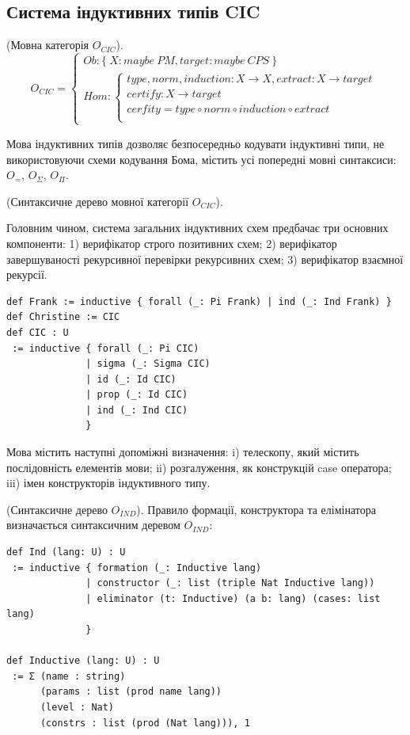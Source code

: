 \newpage
\subsection{Система індуктивних типів CIC}

\begin{definition} (Мовна категорія $O_{CIC}$).
\begin{equation}
O_{CIC} =
\begin{cases}
Ob: \{\ X: maybe\ PM, target: maybe\ CPS\ \} \\
Hom: \begin{cases}
type,norm,induction: X \rightarrow X, extract: X \rightarrow target \\
certify : X \rightarrow target \\
cerfity = type \circ norm \circ induction \circ extract \\
\end{cases}
\end{cases}
\end{equation}
\end{definition}

Мова індуктивних типів дозволяє безпосередньо кодувати індуктивні типи,
не використовуючи схеми кодування Бома, містить усі попередні мовні синтаксиси:
$O_=$, $O_\Sigma$, $O_\Pi$.

\begin{definition} (Синтаксичне дерево мовної категорії $O_{CIC}$).

Головним чином, система загальних індуктивних схем предбачає три основних компоненти:
1) верифікатор строго позитивних схем;
2) верифікатор завершуваності рекурсивної перевірки рекурсивних схем;
3) верифікатор взаємної рекурсії.

\begin{lstlisting}[mathescape=true]
def Frank := inductive { forall (_: Pi Frank) | ind (_: Ind Frank) }
def Christine := CIC
def CIC : U
 := inductive { forall (_: Pi CIC)
              | sigma (_: Sigma CIC)
              | id (_: Id CIC)
              | prop (_: Id CIC)
              | ind (_: Ind CIC)
              }
\end{lstlisting}
\end{definition}

Мова містить наступні допоміжні визначення: i) телескопу,
який містить послідовність елементів мови; ii) розгалуження,
як конструкцій case оператора; iii) імен конструкторів індуктивного типу.

\begin{definition} (Синтаксичне дерево $O_{IND}$).
Правило формації, конструктора та елімінатора визначається синтаксичним деревом $O_{IND}$:
\begin{lstlisting}[mathescape=true]
def Ind (lang: U) : U
 := inductive { formation (_: Inductive lang)
              | constructor (_: list (triple Nat Inductive lang))
              | eliminator (t: Inductive) (a b: lang) (cases: list lang)
              }

def Inductive (lang: U) : U
 := Σ (name : string)
      (params : list (prod name lang))
      (level : Nat)
      (constrs : list (prod (Nat lang))), 1
\end{lstlisting}
\end{definition}

